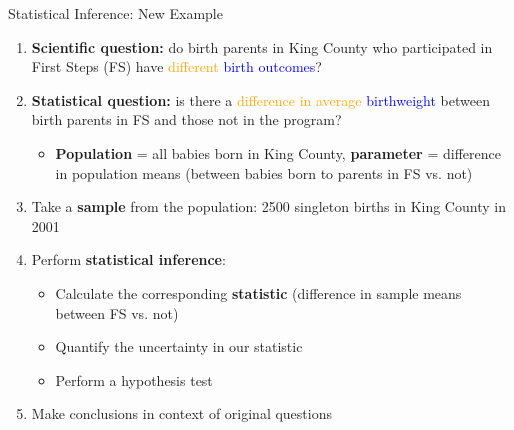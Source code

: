 \documentclass[10pt,t]{beamer}
\begin{document}
\begin{frame}{Statistical Inference: New Example}

\begin{enumerate}
	\item \textbf{Scientific question:} do birth parents in King County who participated in First Steps (FS) have \textcolor{orange}{different} \textcolor{blue}{birth outcomes}?
	\item \textbf{Statistical question:} is there a \textcolor{orange}{difference in average} \textcolor{blue}{birthweight} between birth parents in FS and those not in the program?
	\begin{itemize}
		\item \textbf{Population} = all babies born in King County, \textbf{parameter} = difference in population means (between babies born to parents in FS vs. not)
	\end{itemize}
	\item Take a \textbf{sample} from the population: 2500 singleton births in King County in 2001
	\item Perform \textbf{statistical inference}:
	\begin{itemize}
		\item Calculate the corresponding \textbf{statistic} (difference in sample means between FS vs. not)
		\item Quantify the uncertainty in our statistic
		\item Perform a hypothesis test
	\end{itemize}
	\item Make conclusions in context of original questions
\end{enumerate}

\end{frame}
\end{document}
